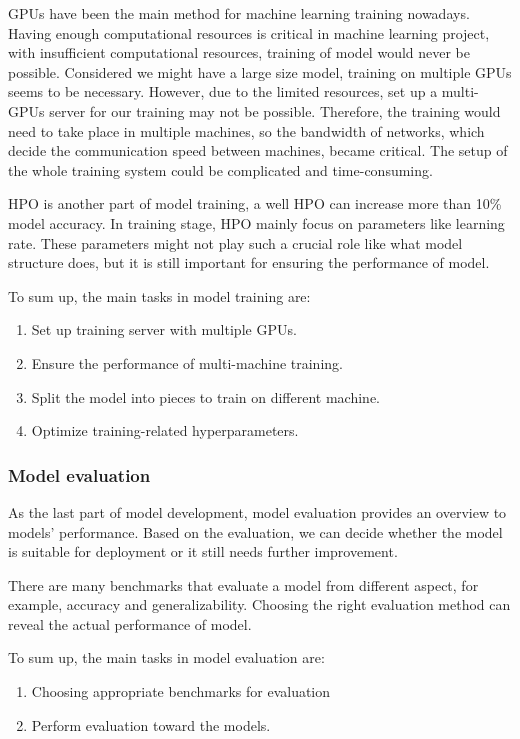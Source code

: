             GPUs have been the main method for machine learning training nowadays. Having enough computational resources is critical in machine learning project, with insufficient computational resources, training of model would never be possible. Considered we might have a large size model, training on multiple GPUs seems to be necessary. However, due to the limited resources, set up a multi-GPUs server for our training may not be possible. Therefore, the training would need to take place in multiple machines, so the bandwidth of networks, which decide the communication speed between machines, became critical. The setup of the whole training system could be complicated and time-consuming.

            HPO is another part of model training, a well HPO can increase more than 10\% model accuracy. In training stage, HPO mainly focus on parameters like learning rate. These parameters might not play such a crucial role like what model structure does, but it is still important for ensuring the performance of model.

            To sum up, the main tasks in model training are:
            \begin{enumerate}
                \item Set up training server with multiple GPUs.
                \item Ensure the performance of multi-machine training.
                \item Split the model into pieces to train on different machine.
                \item Optimize training-related hyperparameters.
            \end{enumerate}

        \subsubsection{Model evaluation}
            As the last part of model development, model evaluation provides an overview to models' performance. Based on the evaluation, we can decide whether the model is suitable for deployment or it still needs further improvement.

            There are many benchmarks that evaluate a model from different aspect, for example, accuracy and generalizability. Choosing the right evaluation method can reveal the actual performance of model.

            To sum up, the main tasks in model evaluation are:
            \begin{enumerate}
                \item Choosing appropriate benchmarks for evaluation
                \item Perform evaluation toward the models.
            \end{enumerate}
